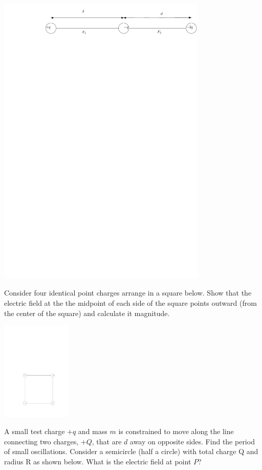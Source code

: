 \documentclass[12pt]{article}
\begin{document}
\includegraphics[width=0.75\textwidth]{3-charges-2.pdf}

\newpage
\noindent Consider four identical point charges arrange in a square below.  Show that the electric field at the the midpoint of each side of the square points outward (from the center of the square) and calculate it magnitude.

\includegraphics[width=0.25\textwidth]{square.pdf}

\newpage
\noindent A small test charge $+q$ and mass $m$ is constrained to move along the line connecting two charges, $+Q$, that are $d$ away on opposite sides.  Find the period of small oscillations.   
\newpage
\noindent Consider a semicircle (half a circle) with total charge Q and radius R as shown below.  What is the electric field at point $P$?
\end{document}
